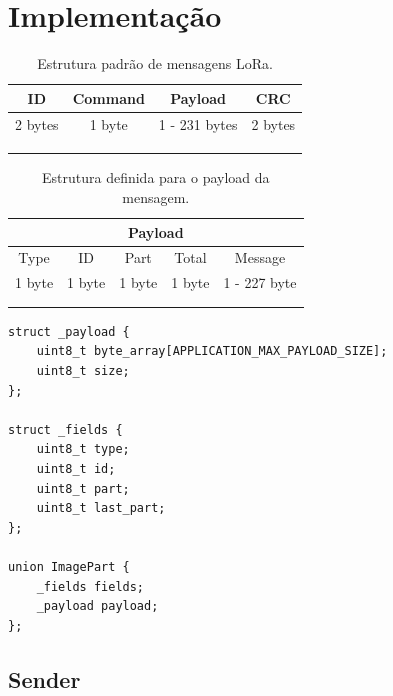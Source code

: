 \documentclass[
article,			%
12pt,				%
oneside,			%
a4paper,			%
english,			%
brazil,				%
sumario=tradicional
]{abntex2}
\begin{document}
\cleardoublepage

\section{Implementação}

\begin{table}[]
\caption{Estrutura padrão de mensagens LoRa.}
\centering
\begin{tabular}{llll}
\hline
\multicolumn{1}{|c|}{ID}      & \multicolumn{1}{c|}{Command} & \multicolumn{1}{c|}{Payload}       & \multicolumn{1}{c|}{CRC}     \\ \hline
\multicolumn{1}{|c|}{2 bytes} & \multicolumn{1}{c|}{1 byte}  & \multicolumn{1}{c|}{1 - 231 bytes} & \multicolumn{1}{c|}{2 bytes} \\ \hline
 &  &  &  \\
 &  &  &  \\
 &  &  & 
\end{tabular}
\end{table}

\begin{table}[]
\caption{Estrutura definida para o payload da mensagem.}
\centering
\begin{tabular}{cllll}
\hline
\multicolumn{5}{|c|}{Payload}    \\ \hline
\multicolumn{1}{|c|}{Type}   & \multicolumn{1}{c|}{ID}     & \multicolumn{1}{c|}{Part}   & \multicolumn{1}{c|}{Total}  & \multicolumn{1}{c|}{Message}      \\ \hline
\multicolumn{1}{|c|}{1 byte} & \multicolumn{1}{c|}{1 byte} & \multicolumn{1}{c|}{1 byte} & \multicolumn{1}{c|}{1 byte} & \multicolumn{1}{c|}{1 - 227 byte} \\ \hline
\multicolumn{1}{l}{} &  &  &  &  \\
\multicolumn{1}{l}{} &  &  &  & 
\end{tabular}
\end{table}

\begin{lstlisting}[title=Definição da estrutura do payload]
struct _payload {
    uint8_t byte_array[APPLICATION_MAX_PAYLOAD_SIZE];
    uint8_t size;
};

struct _fields {
    uint8_t type;
    uint8_t id;
    uint8_t part;
    uint8_t last_part;
};

union ImagePart {
    _fields fields;
    _payload payload;
};
\end{lstlisting}

\subsection{Sender}
\end{document}
